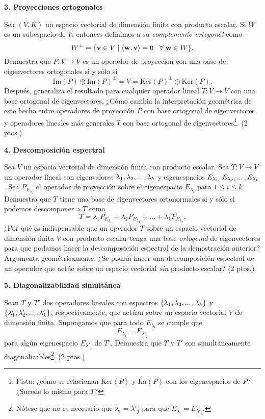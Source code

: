 \documentclass[a4paper]{article}
\begin{document}
\vspace{5mm}
\textbf{3. Proyecciones ortogonales}

Sea $(V,K)$ un espacio vectorial de dimensión finita con producto escalar. Si $W$ es un subespacio de $V$, entonces definimos a su \emph{complemento ortogonal} como $$W^\perp = \{\mathbf{v}\in V\mid \langle \mathbf{w}, \mathbf{v}\rangle = 0\hspace{3mm}\forall\hspace{1mm}\mathbf{w}\in W\}.$$ Demuestra que $P:V\to V$ es un operador de proyección con una base de eigenvectores ortogonales si y sólo si $$\text{Im}(P) \oplus \text{Im}(P)^\perp = V = \text{Ker}(P)^\perp \oplus \text{Ker}(P).$$ Después, generaliza el resultado para cualquier operador lineal $T:V\to V$ con una base ortogonal de eigenvectores. ¿Cómo cambia la interpretación geométrica de este hecho entre operadores de proyección $P$ con base ortogonal de eigenvectores y operadores lineales más generales $T$ con base ortogonal de eigenvectores\footnote{Pista: ¿cómo se relacionan $\text{Ker}(P)$ y $\text{Im}(P)$ con los eigenespacios de $P$? ¿Sucede lo mismo para $T$?}. (2 ptos.)

\vspace{5mm}
\textbf{4. Descomposición espectral} 

Sea $V$ un espacio vectorial de dimensión finita con producto escalar. Sea $T:V\to V$ un operador lineal con eigenvalores $\lambda_1, \lambda_2, ...\hspace{0.5mm}, \lambda_k$ y eigenespacios $E_{\lambda_1},E_{\lambda_2},...\hspace{0.5mm},E_{\lambda_k}$. Sea $P_{E_{\lambda_i}}$ el operador de proyección sobre el eigenespacio $E_{\lambda_i}$ para $1\leq i\leq k$. Demuestra que $T$ tiene una base de eigenvectores ortonormales si y sólo si podemos descomponer a $T$ como $$T = \lambda_1 P_{E_{\lambda_1}} + \lambda_2 P_{E_{\lambda_2}}+...+\lambda_k P_{E_{\lambda_k}}.$$ ¿Por qué es indispensable que un operador $T$ sobre un espacio vectorial de dimensión finita $V$ con producto escalar tenga una base \emph{ortogonal} de eigenvectores para que podamos hacer la descomposición espectral de la demostración anterior? Argumenta geométricamente. ¿Se podría hacer una descomposición espectral de un operador que actúe sobre un espacio vectorial \emph{sin} producto escalar? (2 ptos.)

\vspace{5mm}
\textbf{5. Diagonalizabilidad simultánea}

Sean $T$ y $T'$ dos operadores lineales con espectros $\{\lambda_1,\lambda_2,...\hspace{0.5mm},\lambda_k\}$ y $\{\lambda'_1,\lambda'_2,...\hspace{0.5mm},\lambda'_k\}$, respectivamente, que actúan sobre un espacio vectorial $V$ de dimensión finita. Supongamos que para todo $E_{\lambda_i}$ se cumple que $$E_{\lambda_i}=E_{\lambda'_j}$$ para algún eigenespacio $E_{\lambda'_j}$ de $T'$. Demuestra que $T$ y $T'$ son simultáneamente diagonalizables\footnote{Nótese que no es necesario que $\lambda_i=\lambda'_j$ para que $E_{\lambda_i}=E_{\lambda'_j}.$}. (2 ptos.)
\end{document}
